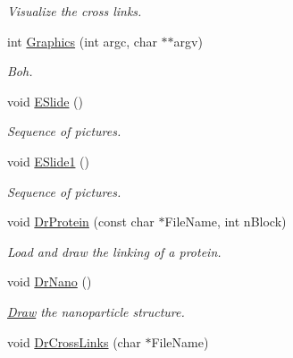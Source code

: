\begin{DoxyCompactItemize}
\begin{DoxyCompactList}\small\item\em Visualize the cross links. \end{DoxyCompactList}\item 
int \hyperlink{classElPoly_a7411c318f14258f65a45ba2572697aa2}{Graphics} (int argc, char $\ast$$\ast$argv)\hypertarget{classElPoly_a7411c318f14258f65a45ba2572697aa2}{}\label{classElPoly_a7411c318f14258f65a45ba2572697aa2}

\begin{DoxyCompactList}\small\item\em Boh. \end{DoxyCompactList}\item 
void \hyperlink{classElPoly_aefdc3015aefee9868dcb006c9e0832a7}{E\+Slide} ()\hypertarget{classElPoly_aefdc3015aefee9868dcb006c9e0832a7}{}\label{classElPoly_aefdc3015aefee9868dcb006c9e0832a7}

\begin{DoxyCompactList}\small\item\em Sequence of pictures. \end{DoxyCompactList}\item 
void \hyperlink{classElPoly_a6a2fcfb542bf2fb11d876bf91caa4625}{E\+Slide1} ()\hypertarget{classElPoly_a6a2fcfb542bf2fb11d876bf91caa4625}{}\label{classElPoly_a6a2fcfb542bf2fb11d876bf91caa4625}

\begin{DoxyCompactList}\small\item\em Sequence of pictures. \end{DoxyCompactList}\item 
void \hyperlink{classElPoly_aebd566fd1ad758de2396c7fbae4b9513}{Dr\+Protein} (const char $\ast$File\+Name, int n\+Block)\hypertarget{classElPoly_aebd566fd1ad758de2396c7fbae4b9513}{}\label{classElPoly_aebd566fd1ad758de2396c7fbae4b9513}

\begin{DoxyCompactList}\small\item\em Load and draw the linking of a protein. \end{DoxyCompactList}\item 
void \hyperlink{classElPoly_ae275d0b38624e312933078176e3af3dc}{Dr\+Nano} ()\hypertarget{classElPoly_ae275d0b38624e312933078176e3af3dc}{}\label{classElPoly_ae275d0b38624e312933078176e3af3dc}

\begin{DoxyCompactList}\small\item\em \hyperlink{classDraw}{Draw} the nanoparticle structure. \end{DoxyCompactList}\item 
void \hyperlink{classElPoly_aa295400ea854251339f20cdb30dd9ac0}{Dr\+Cross\+Links} (char $\ast$File\+Name)\hypertarget{classElPoly_aa295400ea854251339f20cdb30dd9ac0}{}\label{classElPoly_aa295400ea854251339f20cdb30dd9ac0}


\end{DoxyCompactItemize}
